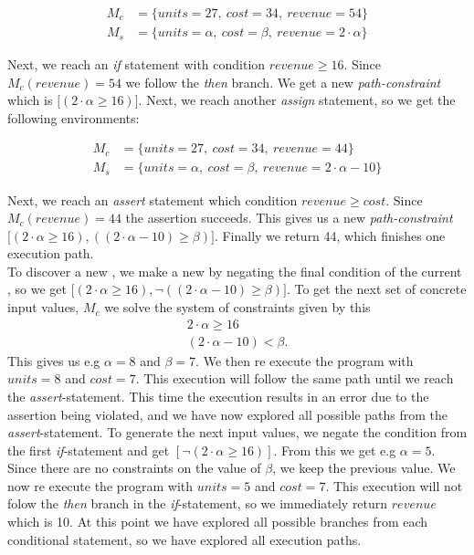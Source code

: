 \begin{align*}
	M_c & = \{units = 27, \ cost = 34, \ revenue = 54 \}\\
	M_s & = \{units = \alpha, \ cost = \beta, \ revenue = 2\cdot \alpha \}
\end{align*}

Next, we reach an \textsl{if} statement with condition $revenue \geq 16$. Since $M_c(revenue) = 54$ we follow the \textsl{then} branch. We get a new \emph{path-constraint} which is $\lbrack (2\cdot \alpha \geq 16) \rbrack$. Next, we reach another \textsl{assign} statement, so we get the following environments:

\begin{align*}
	M_c & = \{units = 27, \ cost = 34, \ revenue = 44 \}\\
	M_s & = \{ units = \alpha, \ cost = \beta, \ revenue = 2 \cdot \alpha - 10 \}
\end{align*}

Next, we reach an \textsl{assert} statement which condition $revenue \geq cost$. Since $M_c(revenue) = 44$ the assertion succeeds. This gives us a new \emph{path-constraint} $\lbrack (2\cdot \alpha \geq 16) , ((2\cdot \alpha - 10) \geq \beta) \rbrack$. Finally we return 44, which finishes one execution path.\\
To discover a new \pc, we make a new \pc by negating the final condition of the current \pc, so we get $\lbrack (2\cdot \alpha \geq 16), \neg ((2\cdot \alpha - 10) \geq \beta) \rbrack$. To get the next set of concrete input values, $M_c$ we solve the system of constraints given by this \pc
\begin{align*}
	2\cdot \alpha \geq 16\\
	(2\cdot \alpha - 10) < \beta.
\end{align*}
This gives us e.g $\alpha = 8$ and $\beta = 7$. 
We then re execute the program with $units = 8$ and $cost = 7$. This execution will follow the same path until we reach the \textsl{assert}-statement. This time the execution results in an error due to the assertion being violated, and we have now explored all possible paths from the \textsl{assert}-statement. To generate the next input values, we negate the condition from the first \textsl{if}-statement and get $[\neg (2\cdot \alpha \geq 16)]$. From this we get e.g $\alpha = 5$. Since there are no constraints on the value of $\beta$, we keep the previous value.  We now re execute the program with $units = 5$ and $cost = 7$. This execution will not folow the \textsl{then} branch in the \textsl{if}-statement, so we immediately return $revenue$ which is 10. At this point we have explored all possible branches from each conditional statement, so we have explored all execution paths. 

